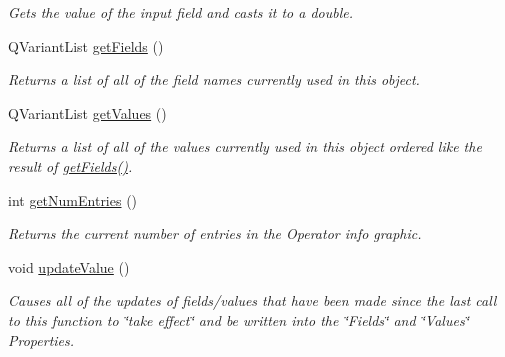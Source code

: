 \begin{DoxyCompactItemize}
\begin{DoxyCompactList}\small\item\em Gets the value of the input field and casts it to a double. \end{DoxyCompactList}\item 
\hypertarget{class_picto_1_1_operator_info_graphic_a33811e677b4b434d45d35145a6acb523}{Q\-Variant\-List \hyperlink{class_picto_1_1_operator_info_graphic_a33811e677b4b434d45d35145a6acb523}{get\-Fields} ()}\label{class_picto_1_1_operator_info_graphic_a33811e677b4b434d45d35145a6acb523}

\begin{DoxyCompactList}\small\item\em Returns a list of all of the field names currently used in this object. \end{DoxyCompactList}\item 
\hypertarget{class_picto_1_1_operator_info_graphic_a5f262b212bbfbf3c825f108af285a5c4}{Q\-Variant\-List \hyperlink{class_picto_1_1_operator_info_graphic_a5f262b212bbfbf3c825f108af285a5c4}{get\-Values} ()}\label{class_picto_1_1_operator_info_graphic_a5f262b212bbfbf3c825f108af285a5c4}

\begin{DoxyCompactList}\small\item\em Returns a list of all of the values currently used in this object ordered like the result of \hyperlink{class_picto_1_1_operator_info_graphic_a33811e677b4b434d45d35145a6acb523}{get\-Fields()}. \end{DoxyCompactList}\item 
int \hyperlink{class_picto_1_1_operator_info_graphic_a39f55a67ffe13568942b88ea68472c78}{get\-Num\-Entries} ()
\begin{DoxyCompactList}\small\item\em Returns the current number of entries in the Operator info graphic. \end{DoxyCompactList}\item 
\hypertarget{class_picto_1_1_operator_info_graphic_a4a0725c53c59ac67d4e86c48ac50eeac}{void \hyperlink{class_picto_1_1_operator_info_graphic_a4a0725c53c59ac67d4e86c48ac50eeac}{update\-Value} ()}\label{class_picto_1_1_operator_info_graphic_a4a0725c53c59ac67d4e86c48ac50eeac}

\begin{DoxyCompactList}\small\item\em Causes all of the updates of fields/values that have been made since the last call to this function to \char`\"{}take effect\char`\"{} and be written into the \char`\"{}\-Fields\char`\"{} and \char`\"{}\-Values\char`\"{} Properties. \end{DoxyCompactList}\end{DoxyCompactItemize}
